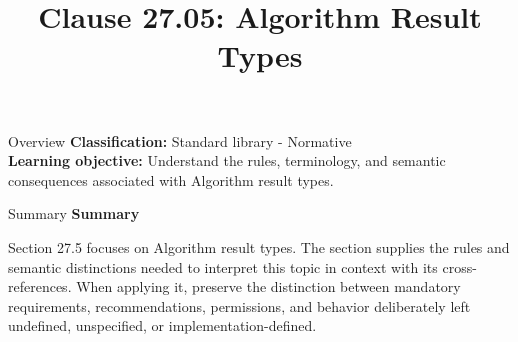 \documentclass[10pt,letterpaper]{article}
\title{Clause 27.05: Algorithm Result Types}
\author{}
\date{}
\begin{document}
\maketitle
\begin{CornellOverviewBox}{Overview}
\textbf{Classification:} Standard library - Normative\\[2pt]
\textbf{Learning objective:} Understand the rules, terminology, and semantic consequences associated with Algorithm result types.
\end{CornellOverviewBox}\begin{CornellSummaryBox}{Summary}
{\sffamily\bfseries\color{Accent} Summary}\par\vspace{3pt}Section 27.5 focuses on Algorithm result types. The section supplies the rules and semantic distinctions needed to interpret this topic in context with its cross-references. When applying it, preserve the distinction between mandatory requirements, recommendations, permissions, and behavior deliberately left undefined, unspecified, or implementation-defined.
\end{CornellSummaryBox}
\end{document}

